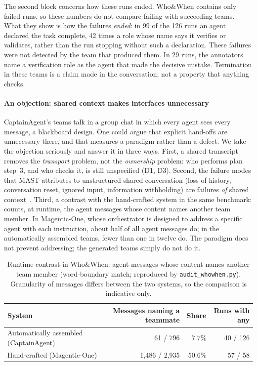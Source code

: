 \documentclass[10pt,a4paper]{article}
\newcommand{\D}[1]{\textsf{D#1}}
\newcommand{\file}[1]{\texttt{#1}}
\begin{document}
The second block concerns how these runs ended. Who\&When contains only
failed runs, so these numbers do not compare failing with succeeding teams.
What they show is how the failures \emph{ended}: in 99 of the 126 runs an
agent declared the task complete, 42 times a role whose name says it
verifies or validates, rather than the run stopping without such a
declaration. These failures were not detected by the team that produced
them. In 29 runs, the annotators name a verification role as the agent
that made the decisive mistake. Termination in these teams is a claim made
in the conversation, not a property that anything checks.

\paragraph{An objection: shared context makes interfaces unnecessary}
CaptainAgent's teams talk in a group chat in which every agent sees every
message, a blackboard design. One could argue that explicit hand-offs are
unnecessary there, and that  measures a paradigm rather
than a defect. We take the objection seriously and answer it in three
ways. First, a shared transcript removes the \emph{transport} problem, not
the \emph{ownership} problem: who performs plan step~3, and who checks it,
is still unspecified (\D{1}, \D{3}). Second, the failure modes that MAST
attributes to unstructured shared conversation (loss of history,
conversation reset, ignored input, information withholding) are failures
\emph{of} shared context~\cite{cemri2025mast}. Third, a contrast with the
hand-crafted system in the same benchmark:  counts, at
runtime, the agent messages whose content names another team member. In
Magentic-One, whose orchestrator is designed to address a specific agent
with each instruction, about half of all agent messages do; in the
automatically assembled teams, fewer than one in twelve do. The paradigm
does not prevent addressing; the generated teams simply do not do it.

\begin{table}[!htb]
\centering\small
\caption{Runtime contrast in Who\&When: agent messages whose content names
another team member (word-boundary match; reproduced by
\file{audit_whowhen.py}). Granularity of messages differs between the two
systems, so the comparison is indicative only.}
\label{tab:contrast}
\begin{tabular}{@{}l r r r@{}}
\toprule
System & Messages naming a teammate & Share & Runs with any \\
\midrule
Automatically assembled (CaptainAgent) & 61 / 796 & 7.7\% & 40 / 126 \\
Hand-crafted (Magentic-One) & 1{,}486 / 2{,}935 & 50.6\% & 57 / 58 \\
\bottomrule
\end{tabular}
\end{table}
\end{document}
